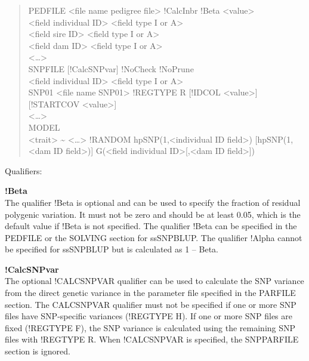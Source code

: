 \begin{quote}
PEDFILE \textless file name pedigree file\textgreater{} !CalcInbr !Beta
\textless value\textgreater{}\\
\textless field individual ID\textgreater{} \textless field type I or
A\textgreater{}\\
\textless field sire ID\textgreater{} \textless field type I or
A\textgreater{}\\
\textless field dam ID\textgreater{} \textless field type I or
A\textgreater{}\\
\textless\ldots\textgreater{}\\
SNPFILE {[}!CalcSNPvar{]} !NoCheck !NoPrune\\
\textless field individual ID\textgreater{} \textless field type I or
A\textgreater{}\\
SNP01 \textless file name SNP01\textgreater{} !REGTYPE R {[}!IDCOL
\textless value\textgreater{]} {[}!STARTCOV
\textless value\textgreater{]}\\
\textless\ldots\textgreater{}\\
MODEL\\
\textless trait\textgreater{} \textasciitilde{}
\textless\ldots\textgreater{} !RANDOM hpSNP(1,\textless individual ID
field\textgreater) {[}hpSNP(1,\textless dam ID field\textgreater){]}
G(\textless field individual ID\textgreater{[},\textless dam ID
field\textgreater{]})
\end{quote}

Qualifiers:

\textbf{!Beta }\\
The qualifier !Beta is optional and can be used to specify the fraction
of residual polygenic variation. It must not be zero and should be at
least 0.05, which is the default value if !Beta is not specified. The
qualifier !Beta can be specified in the PEDFILE or the SOLVING section
for ssSNPBLUP. The qualifier !Alpha cannot be specified for ssSNPBLUP
but is calculated as 1 -- Beta.

\textbf{!CalcSNPvar}\\
The optional !CALCSNPVAR qualifier can be used to calculate the SNP
variance from the direct genetic variance in the parameter file
specified in the PARFILE section. The CALCSNPVAR qualifier must not be
specified if one or more SNP files have SNP-specific variances (!REGTYPE
H). If one or more SNP files are fixed (!REGTYPE F), the SNP variance is
calculated using the remaining SNP files with !REGTYPE R. When
!CALCSNPVAR is specified, the SNPPARFILE section is ignored.

